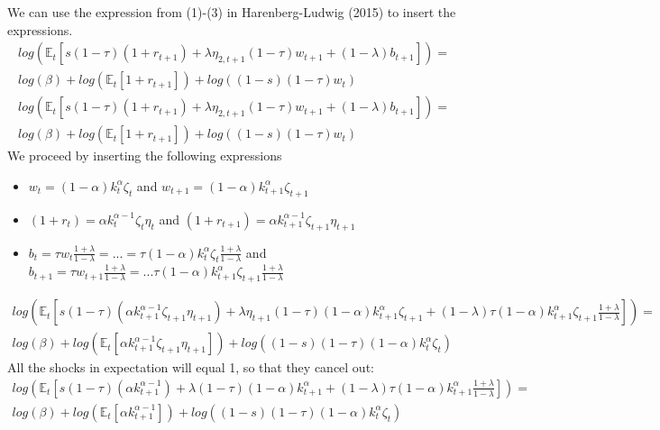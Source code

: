 \documentclass[12pt,a4paper]{article}
\begin{document}
We can use the expression from (1)-(3) in Harenberg-Ludwig (2015) to insert the expressions.
\begin{align*}
          log\left( \mathbb{E}_t\left[ s(1-\tau)(1+r_{t+1}) + \lambda\eta_{2,t+1}(1-\tau)w_{t+1} + (1-\lambda)b_{t+1}\right]\right) = \\          log\left(\beta\right) + log\left( \mathbb{E}_t \left[1+r_{t+1}\right]\right) + log\left( (1-s)(1-\tau)w_t \right)
\end{align*}
\begin{align*}
          log\left( \mathbb{E}_t\left[ s(1-\tau)(1+r_{t+1}) + \lambda\eta_{2,t+1}(1-\tau)w_{t+1} + (1-\lambda)b_{t+1} \right]\right) = \\          log\left(\beta\right) +  log\left( \mathbb{E}_t \left[1+r_{t+1}\right]\right) + log\left( (1-s)(1-\tau)w_t \right)
\end{align*}
We proceed by inserting the following expressions
\begin{itemize}
    \item $w_t =(1-\alpha)k_t^\alpha\zeta_t$ and $w_{t+1}=(1-\alpha)k_{t+1}^\alpha\zeta_{t+1}$
    \item $(1 +r_t) =\alpha k_t^{\alpha -1 }\zeta_t\eta_t$ and $(1+r_{t+1}) = \alpha k_{t+1}^{\alpha -1 }\zeta_{t+1}\eta_{t+1}$
    \item $b_t = \tau w_t \frac{1+\lambda}{1-\lambda} = ... =\tau (1-\alpha)k_t^\alpha\zeta_t \frac{1+\lambda}{1-\lambda}  $ and\\
    $b_{t+1} = \tau w_{t+1} \frac{1+\lambda}{1-\lambda} = ... \tau (1-\alpha)k_{t+1}^\alpha\zeta_{t+1} \frac{1+\lambda}{1-\lambda} $
\end{itemize}
\begin{align*}
          log\left( \mathbb{E}_t\left[ s(1-\tau)(\alpha k_{t+1}^{\alpha -1 }\zeta_{t+1}\eta_{t+1}) + \lambda\eta_{t+1}(1-\tau)(1-\alpha)k_{t+1}^\alpha\zeta_{t+1} + (1-\lambda)\tau (1-\alpha)k_{t+1}^\alpha\zeta_{t+1} \frac{1+\lambda}{1-\lambda} \right]\right) = \\          log\left(\beta\right) +  log\left( \mathbb{E}_t \left[\alpha k_{t+1}^{\alpha -1 }\zeta_{t+1}\eta_{t+1}\right]\right) + log\left( (1-s)(1-\tau)(1-\alpha)k_t^\alpha\zeta_t \right)
\end{align*}
All the shocks in expectation will equal 1, so that they cancel out:
\begin{align*}
          log\left( \mathbb{E}_t\left[ s(1-\tau)(\alpha k_{t+1}^{\alpha -1 }) + \lambda(1-\tau)(1-\alpha)k_{t+1}^\alpha+ (1-\lambda)\tau (1-\alpha)k_{t+1}^\alpha \frac{1+\lambda}{1-\lambda} \right]\right) = \\          log\left(\beta\right) +  log\left( \mathbb{E}_t \left[\alpha k_{t+1}^{\alpha -1 }\right]\right) + log\left( (1-s)(1-\tau)(1-\alpha)k_t^\alpha\zeta_t \right)
\end{align*}
\end{document}

